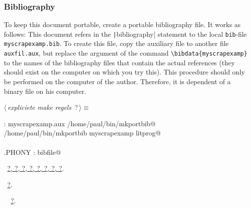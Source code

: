\documentclass[twoside]{artikel3}
\renewcommand{\NWlink}[2]{\hyperlink{#1}{#2}}
\renewcommand{\NWtarget}[2]{\hypertarget{#1}{#2}}
\renewcommand{\NWsep}{$\diamond$\rule[-1\baselineskip]{0pt}{1\baselineskip}}
\renewcommand{\NWlink}[2]{\hyperlink{#1}{#2}}
\renewcommand{\NWtarget}[2]{\hypertarget{#1}{#2}}
\begin{document}
\subsubsection{Bibliography}
\label{sec:bbliography}

To keep this document portable, create a portable bibliography
file. It works as follows: This document refers in the
\texttt|bibliography| statement to the local \verb|bib|-file
\verb|myscrapexamp.bib|. To create this file, copy the auxiliary file
to another file \verb|auxfil.aux|, but replace the argument of the
command \verb|\bibdata{myscrapexamp}| to the names of the bibliography
files that contain the actual references (they should exist on the
computer on which you try this). This procedure should only be
performed on the computer of the author. Therefore, it is dependent of
a binary file on his computer.


\begin{flushleft} \small
\begin{minipage}{\linewidth}\label{scrap16}\raggedright\small
\NWtarget{nuweb?}{} $\langle\,${\itshape expliciete make regels}\nobreak\ {\footnotesize {?}}$\,\rangle\equiv$
\vspace{-1ex}
\begin{list}{}{} \item
\mbox{}\verb@bibfile : myscrapexamp.aux /home/paul/bin/mkportbib@\\
\mbox{}\verb@        /home/paul/bin/mkportbib myscrapexamp litprog@\\
\mbox{}\verb@@\\
\mbox{}\verb@.PHONY : bibfile@\\
\mbox{}\verb@@{\NWsep}
\end{list}
\vspace{-1.5ex}
\footnotesize
\begin{list}{}{\setlength{\itemsep}{-\parsep}\setlength{\itemindent}{-\leftmargin}}
\item \NWtxtMacroDefBy\ \NWlink{nuweb?}{?}\NWlink{nuweb?}{, ?}\NWlink{nuweb?}{, ?}\NWlink{nuweb?}{, ?}\NWlink{nuweb?}{, ?}\NWlink{nuweb?}{, ?}\NWlink{nuweb?}{, ?}\NWlink{nuweb?}{, ?}.
\item \NWtxtMacroRefIn\ \NWlink{nuweb?}{?}.
\item \NWtxtIdentsUsed\nobreak\  \verb@PHONY@\nobreak\ \NWlink{nuweb?}{?}.
\item{}
\end{list}
\end{minipage}\vspace{4ex}
\end{flushleft}
\end{document}
